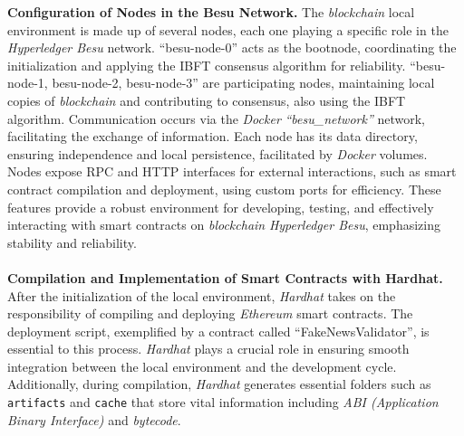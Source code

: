 \noindent\textbf{Configuration of Nodes in the Besu Network.} The \textit{blockchain} local environment is made up of several nodes, each one playing a specific role in the \textit{Hyperledger Besu} network. ``besu-node-0'' acts as the bootnode, coordinating the initialization and applying the IBFT consensus algorithm for reliability. ``besu-node-1, besu-node-2, besu-node-3'' are participating nodes, maintaining local copies of \textit{blockchain} and contributing to consensus, also using the IBFT algorithm. Communication occurs via the \textit{Docker} \textit{``besu\_network''} network, facilitating the exchange of information. Each node has its data directory, ensuring independence and local persistence, facilitated by \textit{Docker} volumes. Nodes expose RPC and HTTP interfaces for external interactions, such as smart contract compilation and deployment, using custom ports for efficiency. These features provide a robust environment for developing, testing, and effectively interacting with smart contracts on \textit{blockchain} \textit{Hyperledger Besu}, emphasizing stability and reliability.
\\\\
\noindent\textbf{Compilation and Implementation of Smart Contracts with Hardhat.} After the initialization of the local environment, \textit{Hardhat} takes on the responsibility of compiling and deploying \textit{Ethereum} smart contracts. The deployment script, exemplified by a contract called ``FakeNewsValidator'', is essential to this process. \textit{Hardhat} plays a crucial role in ensuring smooth integration between the local environment and the development cycle. Additionally, during compilation, \textit{Hardhat} generates essential folders such as \texttt{artifacts} and \texttt{cache} that store vital information including \textit{ABI (Application Binary Interface)} and  \textit{bytecode}.



